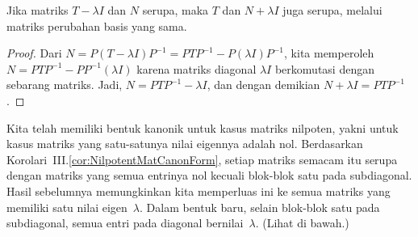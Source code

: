 \begin{lemma}   \label{le:SimRespAddScalar}
Jika matriks \( T-\lambda I \) dan \( N \) serupa,
maka \( T \) dan \( N+\lambda I \) juga serupa,
melalui matriks perubahan basis yang sama.
\end{lemma}

\begin{proof}
Dari \( N=P(T-\lambda I)P^{-1}=PTP^{-1}-P(\lambda I)P^{-1} \),
kita memperoleh $N=PTP^{-1}-PP^{-1}(\lambda I)$
karena matriks diagonal \( \lambda I \) berkomutasi dengan sebarang matriks.
Jadi, \( N=PTP^{-1}-\lambda I \),
dan dengan demikian \( N+\lambda I=PTP^{-1} \).
\end{proof}

Kita telah memiliki bentuk kanonik untuk
kasus matriks nilpoten,
yakni untuk kasus matriks yang satu-satunya nilai eigennya adalah nol.
Berdasarkan Korolari~III.\ref{cor:NilpotentMatCanonForm}, setiap
matriks semacam itu serupa dengan matriks yang semua entrinya
nol kecuali blok-blok satu pada subdiagonal.
Hasil sebelumnya memungkinkan kita memperluas ini ke semua
matriks yang memiliki satu nilai eigen~$\lambda$.
Dalam bentuk baru,
selain blok-blok satu pada subdiagonal, semua entri pada diagonal
bernilai~$\lambda$.
(Lihat  di bawah.)

